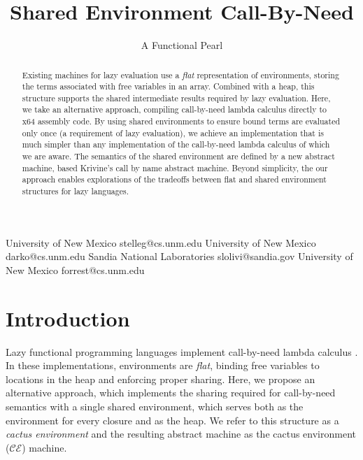 \documentclass[preprint]{sigplanconf}
\begin{document}
\title{Shared Environment Call-By-Need}
\subtitle{A Functional Pearl}

           {University of New Mexico}
           {stelleg@cs.unm.edu}
           {University of New Mexico}
           {darko@cs.unm.edu}
           {Sandia National Laboratories}
           {slolivi@sandia.gov}
           {University of New Mexico}
           {forrest@cs.unm.edu}

\maketitle

\begin{abstract}
  Existing machines for lazy evaluation use a \emph{flat}
  representation of environments, storing the terms associated with
  free variables in an array.  Combined with a heap, this structure
  supports the shared intermediate results required by lazy
  evaluation.  Here, we take an alternative approach, compiling
  call-by-need lambda calculus directly to x64 assembly code.  By
  using shared environments to ensure bound terms are evaluated only
  once (a requirement of lazy evaluation), we achieve an
  implementation that is much simpler than any implementation of the
  call-by-need lambda calculus of which we are aware.  The semantics
  of the shared environment are defined by a new abstract machine, based
  Krivine's call by name abstract machine.  Beyond simplicity, the
  our approach enables explorations of the tradeoffs between flat and
  shared environment structures for lazy languages.

\end{abstract}

\section{Introduction} \label{sec:intro}

Lazy functional programming languages implement call-by-need lambda calculus
\cite{ariola1995call}. In these implementations, environments are \emph{flat},
binding free variables to locations in the heap and enforcing proper sharing.
Here, we propose an alternative approach, which implements the sharing required
for call-by-need semantics with a single shared environment, which serves both
as the environment for every closure and as the heap. We refer to this
structure as a \emph{cactus environment} and the resulting abstract machine as
the cactus environment ($\mathcal{CE}$) machine.
\end{document}
